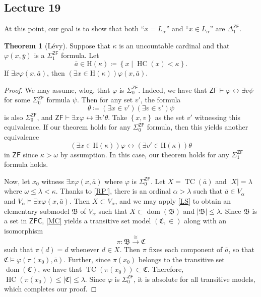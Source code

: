 \documentclass[10pt,letterpaper,cm]{nupset}
\theoremstyle{definition}
\theoremstyle{theorem}
\newtheorem{theorem}[definition]{Theorem}
\theoremstyle{remark}
\newcommand{\C}{\mathfrak C}
\newcommand{\B}{\mathfrak{B}}
\newcommand{\1}{\mathbf{1}}
\newcommand{\0}{\vec 0}
\newcommand{\zf}{\mathsf{ZF}}
\newcommand{\zfc}{\mathsf{ZFC}}
\DeclareMathOperator{\dom}{dom}
\DeclareMathOperator{\hc}{HC}
\DeclareMathOperator{\tc}{TC}
\begin{document}
\subsection{Lecture 19}

At this point, our goal is to show that both ``$x= L_{\alpha}$'' and ``$x\in L_{\alpha}$'' are $\Delta_1^{\zf}$.

\begin{theorem}[L\'evy]\label{levy}
Suppose that $\kappa$ is an uncountable cardinal and that $\varphi(x, \bar{y})$ is a $\Sigma_1^{\zf}$ formula. Let $$\bar{a} \in \mathrm{H}(\kappa) \coloneqq \left\{x \mid \hc(x)<\kappa\right\}.$$ If $\exists{x}\varphi(x, \bar{a})$, then $\left(\exists{x \in \mathrm{H}(\kappa)}\right)\varphi(x, \bar{a})$.
\end{theorem}
\begin{proof}
We may assume, wlog, that $\varphi$ is $\Sigma_0^{\zf}$. Indeed, we have that $\zf \vdash \varphi \leftrightarrow \exists{v}\psi$ for some $\Sigma_0^{\zf}$ formula $\psi$. Then for any set $v'$, the formula
\[
\theta \coloneqq \left(\exists{x\in v'}\right)\left(\exists{v\in v'}\right)\psi
\] is also $\Sigma_0^{\zf}$, and $\zf \vdash \exists{x}\varphi \leftrightarrow \exists{v'}\theta$. Take $\left\{x,v\right\}$ as the set $v'$ witnessing this equivalence. If  our theorem holds for any $\Sigma_0^{\zf}$ formula, then this yields another equivalence
\[
\left(\exists{x \in \mathrm{H}(\kappa)}\right)\varphi \leftrightarrow \left(\exists{v' \in \mathrm{H}(\kappa)}\right)\theta
\] in $\zf$ since $\kappa >\omega$ by assumption. In this case, our theorem holds for any $\Sigma_1^{\zf}$ formula holds.

\smallskip

Now, let $x_0$ witness $\exists{x}\varphi(x, \bar{a})$ where $\varphi$ is $\Sigma_0^{\zf}$. Let $X = \tc(\bar{a})$ and $\lvert{X}\rvert = \lambda$ where $\omega \leq \lambda <\kappa$. Thanks to \cref{RP'}, there is an ordinal $\alpha >\lambda $ such that $\bar{a}\in V_{\alpha}$ and $V_{\alpha} \models \exists{x}\varphi(x,\bar{a})$. Then $X\subset V_{\alpha}$, and we may  apply \cref{LS} to obtain an elementary submodel $\B$ of $V_{\alpha}$ such that $X \subset \dom(\B)$ and $\left\lvert{\B}\right\rvert \leq \lambda$. Since $\B$ is a set in $\zfc$, \cref{MC} yields a transitive set model $\left(\C, \in\right)$ along with an isomorphism
\[
\pi : \B \overset{\cong}{\longrightarrow} \C
\] such that $\pi(d) =d$ whenever $d \in X$. Then $\pi$ fixes each component of $\bar{a}$, so that $\C \models \varphi(\pi(x_0), \bar{a})$.  Further, since $\pi(x_0)$ belongs to the transitive set $\dom(\C)$, we have that $\tc(\pi(x_0)) \subset \C$. Therefore, $\hc(\pi(x_0)) \leq \left\lvert{\C}\right\rvert \leq \lambda$. Since $\varphi$ is $\Sigma_0^{\zf}$, it is absolute for all transitive models, which completes our proof.
\end{proof}
\end{document}
